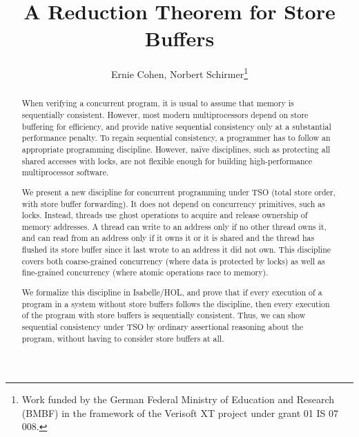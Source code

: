 \documentclass[11pt]{llncs}
\begin{document}

  \title{A Reduction Theorem for Store Buffers}

  \author{Ernie Cohen, Norbert Schirmer\fnmsep\thanks{Work funded by the German Federal Ministry of Education and Research (BMBF) in the framework of the Verisoft XT project under grant 01 IS 07 008.}}


\maketitle


\begin{abstract}

When verifying a concurrent program, it is usual to assume that memory
is sequentially consistent.  However, most modern multiprocessors
depend on store buffering for efficiency, and provide native
sequential consistency only at a substantial performance penalty.  To
regain sequential consistency, a programmer has to follow an
appropriate programming discipline. However, na\"ive disciplines,
such as protecting all shared accesses with locks, are not flexible
enough for building high-performance multiprocessor software.

We present a new discipline for concurrent programming under TSO
(total store order, with store buffer forwarding). It does not depend
on concurrency primitives, such as locks. Instead, threads use ghost
operations to acquire and release ownership of memory addresses. A
thread can write to an address only if no other thread owns it, and
can read from an address only if it owns it or it is shared and the thread
has flushed its store buffer since it last wrote to an address it did
not own. This discipline covers both coarse-grained concurrency (where 
data is protected by locks) as well as fine-grained concurrency (where 
atomic operations race to memory).

We formalize this discipline in Isabelle/HOL, and prove that if every
execution of a program in a system without store buffers follows the
discipline, then every execution of the program with store buffers is
sequentially consistent. Thus, we can show sequential consistency
under TSO by ordinary assertional reasoning about the program, without
having to consider store buffers at all.

\end{abstract}
\end{document}
